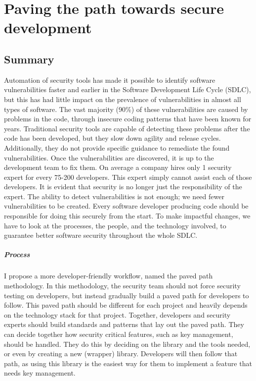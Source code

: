 \chapter*{Paving the path towards secure development}
\section*{Summary}

Automation of security tools has made it possible to identify software vulnerabilities faster and earlier in the Software Development Life Cycle (SDLC), but this has had little impact on the prevalence of vulnerabilities in almost all types of software.
The vast majority (90\%) of these vulnerabilities are caused by problems in the code, through insecure coding patterns that have been known for years.
Traditional security tools are capable of detecting these problems after the code has been developed, but they slow down agility and release cycles. 
Additionally, they do not provide specific guidance to remediate the found vulnerabilities.
Once the vulnerabilities are discovered, it is up to the development team to fix them.
On average a company hires only 1 security expert for every 75-200 developers.
This expert simply cannot assist each of those developers.
It is evident that security is no longer just the responsibility of the expert.
The ability to detect vulnerabilities is not enough; we need fewer vulnerabilities to be created.
Every software developer producing code should be responsible for doing this securely from the start.
To make impactful changes, we have to look at the processes, the people, and the technology involved, to guarantee better software security throughout the whole SDLC.

\paragraph{Process}
I propose a more developer-friendly workflow, named the paved path methodology.
In this methodology, the security team should not force security testing on developers, but instead gradually build a paved path for developers to follow.
This paved path should be different for each project and heavily depends on the technology stack for that project.
Together, developers and security experts should build
standards and patterns that lay out the paved path.
They can decide together how security critical features, such as key management, should be handled.
They do this by deciding on the library and the tools needed, or even by creating a new (wrapper) library.
Developers will then follow that path, as using this library is the easiest way for them to implement a feature that needs key management.

